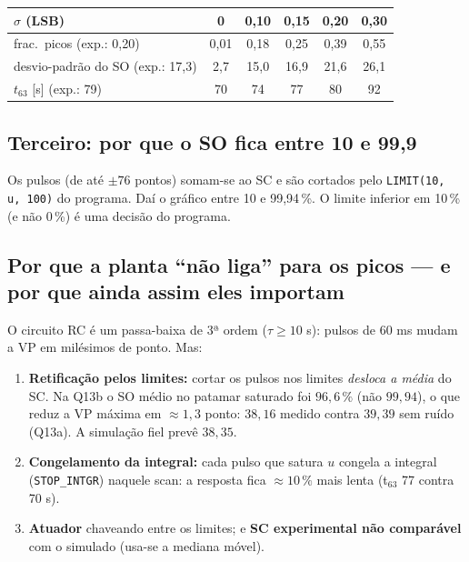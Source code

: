 \begin{enumerate}
\begin{center}\small\begin{tabular}{lccccc}\toprule $\sigma$ (LSB) & 0 & 0,10 & 0,15 & 0,20 & 0,30\\\midrule frac.\ picos (exp.: 0,20) & 0,01 & 0,18 & 0,25 & 0,39 & 0,55\\ desvio-padrão do SO (exp.: 17,3) & 2,7 & 15,0 & 16,9 & 21,6 & 26,1\\ $t_{63}$ [s] (exp.: 79) & 70 & 74 & 77 & 80 & 92\\\bottomrule\end{tabular}\end{center}
\end{enumerate}
\subsection{Terceiro: por que o SO fica entre 10 e 99,9}
Os pulsos (de até $\pm76$ pontos) somam-se ao SC e são cortados pelo \texttt{LIMIT(10,\,u,\,100)} do programa. Daí o gráfico entre 10 e 99,94\,\%. O limite inferior em 10\,\% (e não 0\,\%) é uma decisão do programa.
\subsection{Por que a planta ``não liga'' para os picos --- e por que ainda assim eles importam}
O circuito RC é um passa-baixa de 3ª ordem ($\tau\ge10$ s): pulsos de 60 ms mudam a VP em milésimos de ponto. Mas:
\begin{enumerate}
\item \textbf{Retificação pelos limites:} cortar os pulsos nos limites \emph{desloca a média} do SC. Na Q13b o SO médio no patamar saturado foi $96{,}6\,\%$ (não $99{,}94$), o que reduz a VP máxima em $\approx1{,}3$ ponto: $38{,}16$ medido contra $39{,}39$ sem ruído (Q13a). A simulação fiel prevê $38{,}35$.
\item \textbf{Congelamento da integral:} cada pulso que satura $u$ congela a integral (\texttt{STOP\_INTGR}) naquele scan: a resposta fica $\approx10\,\%$ mais lenta (t$_{63}$ 77 contra 70 s).
\item \textbf{Atuador} chaveando entre os limites; e \textbf{SC experimental não comparável} com o simulado (usa-se a mediana móvel).
\end{enumerate}
